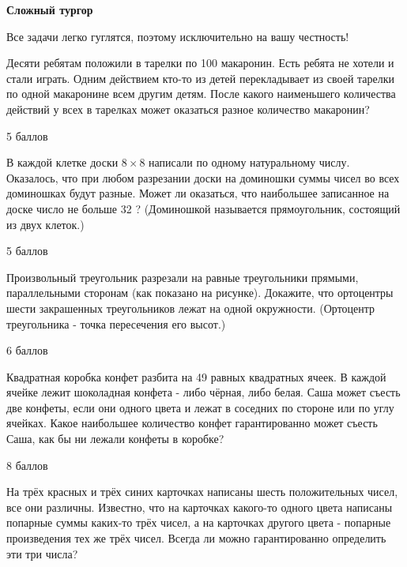 \centerline{\bf \Huge Сложный тургор}

\begin{flushright}
        \scriptsize{Все задачи легко гуглятся, поэтому исключительно на вашу честность!}
\end{flushright}

Десяти ребятам положили в тарелки по 100 макаронин. Есть ребята не хотели и стали играть. Одним действием кто-то из детей перекладывает из своей тарелки по одной макаронине всем другим детям. После какого наименьшего количества действий у всех в тарелках может оказаться разное количество макаронин?

\begin{flushright}
        \scriptsize{5 баллов}
\end{flushright}

В каждой клетке доски $8 \times 8$ написали по одному натуральному числу. Оказалось, что при любом разрезании доски на доминошки суммы чисел во всех доминошках будут разные. Может ли оказаться, что наибольшее записанное на доске число не больше 32 ? (Доминошкой называется прямоугольник, состоящий из двух клеток.)

\begin{flushright}
        \scriptsize{5 баллов}
\end{flushright}

Произвольный треугольник разрезали на равные треугольники прямыми, параллельными сторонам (как показано на рисунке). Докажите, что ортоцентры шести закрашенных треугольников лежат на одной окружности. (Ортоцентр треугольника - точка пересечения его высот.)

\begin{flushright}
        \scriptsize{6 баллов}
\end{flushright}

Квадратная коробка конфет разбита на 49 равных квадратных ячеек. В каждой ячейке лежит шоколадная конфета - либо чёрная, либо белая. Саша может съесть две конфеты, если они одного цвета и лежат в соседних по стороне или по углу ячейках. Какое наибольшее количество конфет гарантированно может съесть Саша, как бы ни лежали конфеты в коробке?


\begin{flushright}
        \scriptsize{8 баллов}
\end{flushright}

На трёх красных и трёх синих карточках написаны шесть положительных чисел, все они различны. Известно, что на карточках какого-то одного цвета написаны попарные суммы каких-то трёх чисел, а на карточках другого цвета - попарные произведения тех же трёх чисел. Всегда ли можно гарантированно определить эти три числа?

